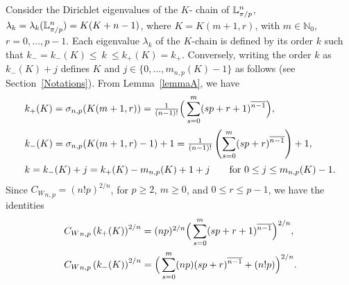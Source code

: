 \documentclass[11pt,a4paper,times]{amsart}
\theoremstyle{plain}
\theoremstyle{definition}
\numberwithin{equation}{section}
\newcommand{\ds}{\displaystyle}
\newcommand{\dsum}{\ds\sum}
\newcommand{\eqskip}{ \vspace*{2mm}\\ }
\newcommand{\Cw}{{ C_W}}
\newcommand{\luned}[2]{\raisebox{0.5pt}{${}$}\mathbb{L}^{#1}_{\pi/#2}}
\newcommand{\txtg}{\textcolor{green}}
\begin{document}
{Consider the Dirichlet eigenvalues of the $K$- chain of $\luned{n}{p}$, $\lambda_k=\lambda_k(\luned{n}{p})=K(K+n-1)$,  where $K=K(m+1,r)$, with  $m\in \mathbb{N}_0$, $r=0, \ldots, p-1$.
 Each eigenvalue $\lambda_k$ of the $K$-chain is defined by its order $k$ such that $k_-=k_-(K)\leq~ k~ \leq k_+(K)=
k_+$. Conversely, writing the order $k$ {as} $k_-(K)+j$ defines $K$ and $j\in\{0, \ldots, m_{n,p}(K)-1\}$ as follows
(see Section~\ref{Notations}). From  Lemma~\ref{lemmaA},   we have 
\begin{gather}\label{k+}
\begin{array}{l}
k_+(K)=\sigma_{n,p}(K(m+1,r))=\frac{1}{(n-1)!}\Big{(} \dsum_{s=0}^m(sp +r+1)^{\overline{n-1}} \Big{)},\eqskip
k_-(K)=\sigma_{n,p}(K(m+1,r)-1)+1
= \frac{1}{(n-1)!}\left(\dsum_{s=0}^{m}(sp +r)^{\overline{n-1}}\right) +1,
\eqskip
k =k_-(K)+j=k_+(K)-m_{n,p}(K)+1+j \quad\quad\mbox{for}~0\leq j\leq m_{n,p}(K)-1.
\end{array}
\end{gather}
Since $\Cw_{n,p}= (n!p)^{2/n}$, for $p\geq 2$, $m\geq 0$, and  $0\leq r\leq p-1$, we have the identities
\begin{gather}\label{cwsnp}
\begin{array}{l}
\Cw_{n,p}\left(k_+(K)\right)^{2/n}=
(np)^{2/n}\Big{(} \dsum_{s=0}^m(sp +r+1)^{\overline{n-1}} \Big{)}^{2/n},
\eqskip
\Cw_{n,p}\left(k_-(K)\right)^{2/n}=
\Big{(} \dsum_{s=0}^m(np)(sp +r)^{\overline{n-1}}+(n!p) \Big{)}^{2/n}.
\end{array}
\end{gather}

}
\end{document}
